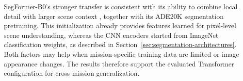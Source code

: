 SegFormer-B0's stronger transfer is consistent with its ability to combine local detail with larger scene context \cite{xie2021segformer}, together with its ADE20K segmentation pretraining. This initialization already provides features learned for pixel-level scene understanding, whereas the CNN encoders started from ImageNet classification weights, as described in Section~\ref{sec:segmentation-architectures}. Both factors may help when mission-specific training data are limited or image appearance changes. The results therefore support the evaluated Transformer configuration for cross-mission generalization.
